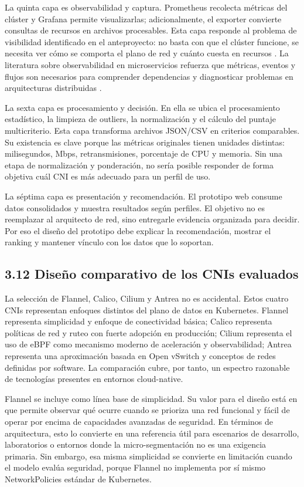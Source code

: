 \documentclass[journal]{IEEEtran}
\begin{document}
La quinta capa es observabilidad y captura. Prometheus recolecta métricas del clúster y Grafana permite visualizarlas; adicionalmente, el exporter convierte consultas de recursos en archivos procesables. Esta capa responde al problema de visibilidad identificado en el anteproyecto: no basta con que el clúster funcione, se necesita ver cómo se comporta el plano de red y cuánto cuesta en recursos \cite{ref29}. La literatura sobre observabilidad en microservicios refuerza que métricas, eventos y flujos son necesarios para comprender dependencias y diagnosticar problemas en arquitecturas distribuidas \cite{ref6}.

La sexta capa es procesamiento y decisión. En ella se ubica el procesamiento estadístico, la limpieza de outliers, la normalización y el cálculo del puntaje multicriterio. Esta capa transforma archivos JSON/CSV en criterios comparables. Su existencia es clave porque las métricas originales tienen unidades distintas: milisegundos, Mbps, retransmisiones, porcentaje de CPU y memoria. Sin una etapa de normalización y ponderación, no sería posible responder de forma objetiva cuál CNI es más adecuado para un perfil de uso.

La séptima capa es presentación y recomendación. El prototipo web consume datos consolidados y muestra resultados según perfiles. El objetivo no es reemplazar al arquitecto de red, sino entregarle evidencia organizada para decidir. Por eso el diseño del prototipo debe explicar la recomendación, mostrar el ranking y mantener vínculo con los datos que lo soportan.

\subsection{3.12 Diseño comparativo de los CNIs evaluados}

La selección de Flannel, Calico, Cilium y Antrea no es accidental. Estos cuatro CNIs representan enfoques distintos del plano de datos en Kubernetes. Flannel representa simplicidad y enfoque de conectividad básica; Calico representa políticas de red y ruteo con fuerte adopción en producción; Cilium representa el uso de eBPF como mecanismo moderno de aceleración y observabilidad; Antrea representa una aproximación basada en Open vSwitch y conceptos de redes definidas por software. La comparación cubre, por tanto, un espectro razonable de tecnologías presentes en entornos cloud-native.

Flannel se incluye como línea base de simplicidad. Su valor para el diseño está en que permite observar qué ocurre cuando se prioriza una red funcional y fácil de operar por encima de capacidades avanzadas de seguridad. En términos de arquitectura, esto lo convierte en una referencia útil para escenarios de desarrollo, laboratorios o entornos donde la micro-segmentación no es una exigencia primaria. Sin embargo, esa misma simplicidad se convierte en limitación cuando el modelo evalúa seguridad, porque Flannel no implementa por sí mismo NetworkPolicies estándar de Kubernetes.
\end{document}
